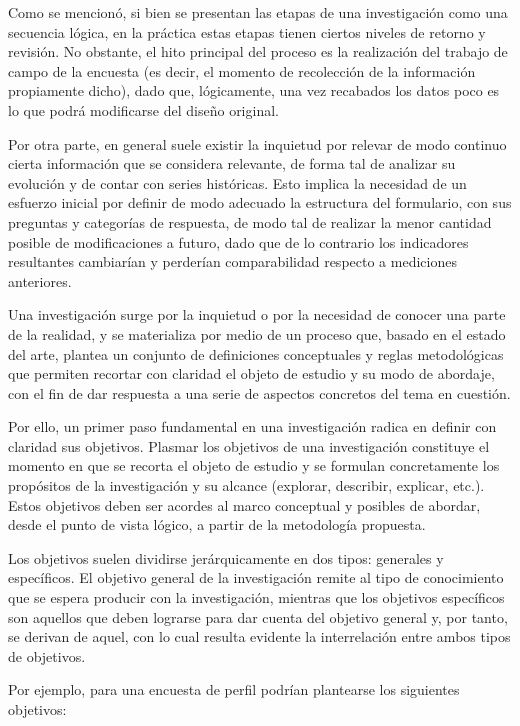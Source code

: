 \documentclass[
]{book}
\begin{document}
Como se mencionó, si bien se presentan las etapas de una investigación como una secuencia lógica, en la práctica estas etapas tienen ciertos niveles de retorno y revisión. No obstante, el hito principal del proceso es la realización del trabajo de campo de la encuesta (es decir, el momento de recolección de la información propiamente dicho), dado que, lógicamente, una vez recabados los datos poco es lo que podrá modificarse del diseño original.

Por otra parte, en general suele existir la inquietud por relevar de modo continuo cierta información que se considera relevante, de forma tal de analizar su evolución y de contar con series históricas. Esto implica la necesidad de un esfuerzo inicial por definir de modo adecuado la estructura del formulario, con sus preguntas y categorías de respuesta, de modo tal de realizar la menor cantidad posible de modificaciones a futuro, dado que de lo contrario los indicadores resultantes cambiarían y perderían comparabilidad respecto a mediciones anteriores.

Una investigación surge por la inquietud o por la necesidad de conocer una parte de la realidad, y se materializa por medio de un proceso que, basado en el estado del arte, plantea un conjunto de definiciones conceptuales y reglas metodológicas que permiten recortar con claridad el objeto de estudio y su modo de abordaje, con el fin de dar respuesta a una serie de aspectos concretos del tema en cuestión.

Por ello, un primer paso fundamental en una investigación radica en definir con claridad sus objetivos. Plasmar los objetivos de una investigación constituye el momento en que se recorta el objeto de estudio y se formulan concretamente los propósitos de la investigación y su alcance (explorar, describir, explicar, etc.). Estos objetivos deben ser acordes al marco conceptual y posibles de abordar, desde el punto de vista lógico, a partir de la metodología propuesta.

Los objetivos suelen dividirse jerárquicamente en dos tipos: generales y específicos. El objetivo general de la investigación remite al tipo de conocimiento que se espera producir con la investigación, mientras que los objetivos específicos son aquellos que deben lograrse para dar cuenta del objetivo general y, por tanto, se derivan de aquel, con lo cual resulta evidente la interrelación entre ambos tipos de objetivos.

Por ejemplo, para una encuesta de perfil podrían plantearse los siguientes objetivos:
\end{document}
